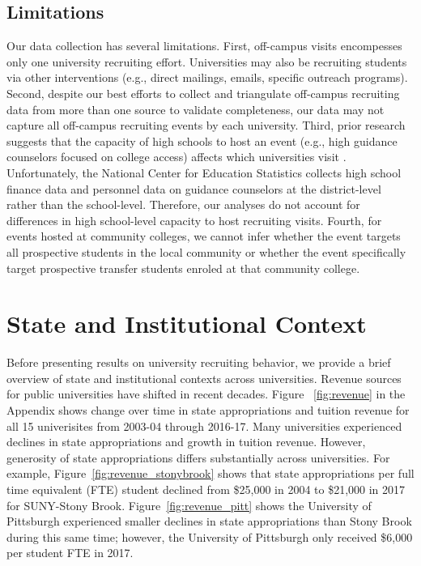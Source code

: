 \documentclass[twoside]{article}
\begin{document}
\subsection*{Limitations}

Our data collection has several limitations. First, off-campus visits encompesses only one university recruiting effort. Universities may also be recruiting students via other interventions (e.g., direct mailings, emails, specific outreach programs). Second, despite our best efforts to collect and triangulate off-campus recruiting data from more than one source to validate completeness, our data may not capture all off-campus recruiting events by each university. Third, prior research suggests that the capacity of high schools to host an event (e.g., high guidance counselors focused on college access) affects which universities visit \citep{RN3519}. Unfortunately, the National Center for Education Statistics collects high school finance data and personnel data on guidance counselors at the district-level rather than the school-level. Therefore, our analyses do not account for differences in high school-level capacity to host recruiting visits.  Fourth, for events hosted at community colleges, we cannot infer whether the event targets all prospective students in the local community or whether the event specifically target prospective transfer students enroled at that community college.


\section*{State and Institutional Context}

Before presenting results on university recruiting behavior, we provide a brief overview of state and institutional contexts across universities. Revenue sources for public universities have shifted in recent decades. Figure ~\ref{fig:revenue} in the Appendix shows change over time in state appropriations and tuition revenue for all 15 univerisites from 2003-04 through 2016-17. Many universities experienced declines in state appropriations and growth in tuition revenue. However, generosity of state appropriations differs substantially across universities. For example, Figure~\ref{fig:revenue_stonybrook} shows that state appropriations per full time equivalent (FTE) student declined from \$25,000 in 2004 to \$21,000 in 2017 for SUNY-Stony Brook. Figure~\ref{fig:revenue_pitt} shows the University of Pittsburgh experienced smaller declines in state appropriations than Stony Brook during this same time; however, the University of Pittsburgh only received \$6,000 per student FTE in 2017.
\end{document}
